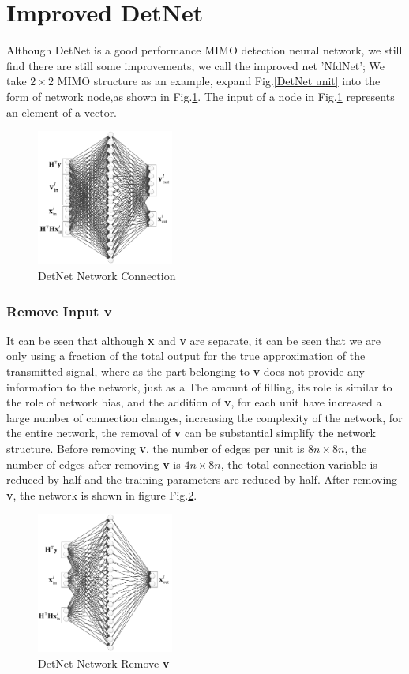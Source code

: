 \documentclass[conference]{IEEEtran}
\begin{document}
\section{Improved DetNet}
Although DetNet is a good performance MIMO detection neural network, we still find there are still some improvements, we call the improved net 'NfdNet';
We take ${2 \times 2}$ MIMO structure as an example, expand Fig.\ref{DetNet unit} into the form of network node,as shown in Fig.\ref{DetNetConnect}. The input of a node in Fig.\ref{DetNetConnect} represents an element of a vector.
\begin{figure}[ht]
  \centering
  \includegraphics[width=0.4\textwidth]{DetNetConnect.pdf}
  \caption{DetNet Network Connection}
  \label{DetNetConnect}
\end{figure}
\subsubsection{Remove Input \textbf{v}} It can be seen that although \textbf{x} and \textbf{v} are separate, it can be seen that we are only using a fraction of the total output for the true approximation of the transmitted signal, where as the part belonging to \textbf{v} does not provide any information to the network, just as a The amount of filling, its role is similar to the role of network bias, and the addition of \textbf{v}, for each unit have increased a large number of connection changes, increasing the complexity of the network, for the entire network, the removal of \textbf{v} can be substantial simplify the network structure. Before removing \textbf{v}, the number of edges per unit is ${8n \times 8n}$, the number of edges after removing \textbf{v} is ${4n \times 8n}$, the total connection variable is reduced by half and the training parameters are reduced by half. After removing \textbf{v}, the network is shown in figure Fig.\ref{DetNetRemoveV}.
\begin{figure}[ht]
  \centering
  \includegraphics[width=0.4\textwidth]{DetNetRemoveV.pdf}
  \caption{DetNet Network Remove \textbf{v}}
  \label{DetNetRemoveV}
\end{figure}
\end{document}
